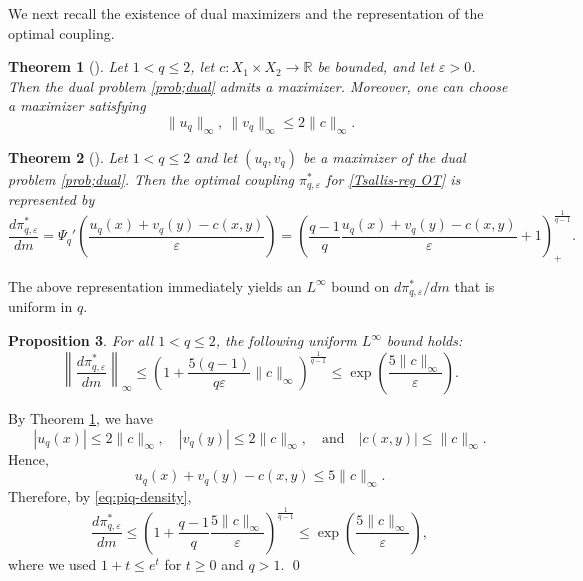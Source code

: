 \documentclass[a4paper,11pt]{article}
\theoremstyle{plain}
\newtheorem{thm}{Theorem}[section]
\newtheorem{prop}[thm]{Proposition}
\theoremstyle{definition}
\theoremstyle{remark}
\theoremstyle{plain}
\newenvironment{pf}[1]
{{\noindent\textbf{Proof of #1.}}}{\hfill \qed}
\numberwithin{equation}{section}
\newcommand{\R}{\mathbb R}
\newcommand{\ep}{\varepsilon}
\newcommand{\1}{\mbox{1}\hspace{-0.25em}\mbox{l}} %
\begin{document}
We next recall the existence of dual maximizers and the representation of the optimal coupling. 

\begin{thm}[{\cite[Lemma 3.3, Theorem 3.4]{di2020optimal}}]\label{thm;estimates of potentials}
Let $1<q\leq2$, let $c:X_1\times X_2\to\R$ be bounded, and let $\ep>0$. Then the dual problem \eqref{prob;dual} admits a maximizer. Moreover, one can choose a maximizer satisfying
\begin{equation*}
\|u_q\|_{\infty}, \ \|v_q\|_{\infty} \leq 2 \|c\|_{\infty}.
\end{equation*}
\end{thm}

\begin{thm}[{\cite[Proposition 3.5, Theorem 3.6]{di2020optimal}}]
Let $1<q\leq2$ and let $(u_q,v_q)$ be a maximizer of the dual problem \eqref{prob;dual}. Then the optimal coupling $\pi_{q,\ep}^*$ for \eqref{Tsallis-reg OT} is represented by
\begin{equation}\label{eq:piq-density}
\frac{d\pi_{q, \ep}^*}{dm} = \Psi_q'\left( \frac{u_q(x) + v_q(y) - c(x,y)}{\ep} \right) = \left(\frac{q - 1}{q} \frac{u_q(x) + v_q(y) - c(x,y)}{\ep} + 1\right)_+^{\frac{1}{q - 1}}.
\end{equation}
\end{thm}
The above representation immediately yields an $L^\infty$ bound on $d\pi_{q, \ep}^*/dm$ that is uniform in $q$.
\begin{prop}\label{prop:uniform-Linfty-density}
For all $1 < q \leq 2$, the following uniform $L^\infty$ bound holds:
\begin{equation*}
\left\| \frac{d\pi_{q, \ep}^*}{dm} \right\|_{\infty}
\leq \left(1+\frac{5 (q - 1)}{q \ep} \|c\|_{\infty}\right)^{\frac{1}{q - 1}}
\leq \exp\left(\frac{5\|c\|_\infty}{\ep}\right).
\end{equation*}
\end{prop}

\begin{pf}{Proposition \ref{prop:uniform-Linfty-density}}
By Theorem \ref{thm;estimates of potentials}, we have
\begin{equation*}
|u_q(x)| \leq 2 \|c\|_{\infty}, \quad |v_q(y)| \leq 2 \|c\|_{\infty}, \quad \mathrm{and}\quad |c(x,y)| \leq \|c\|_{\infty}.
\end{equation*}
Hence,
\begin{equation*}
u_q(x) + v_q(y) - c(x,y) \leq 5 \|c\|_{\infty}.
\end{equation*}
Therefore, by \eqref{eq:piq-density},
\begin{equation*}
\frac{d\pi_{q, \ep}^*}{dm} \leq \left(1+\frac{q - 1}{q} \frac{5 \|c\|_{\infty}}{\ep}\right)^{\frac{1}{q - 1}} \leq\exp\left(\frac{5\|c\|_\infty}{\ep}\right),
\end{equation*}
where we used $1+t\leq e^t$ for $t\geq0$ and $q>1$.
\end{pf}
\end{document}
